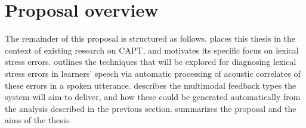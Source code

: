 %
%
%
%
%
%
%
%

\section{Proposal overview}
The remainder of this proposal is structured as follows.
 places this thesis in the context of existing research on CAPT, and motivates its specific focus on lexical stress errors.
 outlines the techniques that will be explored for diagnosing lexical stress errors in learners' speech via automatic processing of acoustic correlates of these errors in a spoken utterance.
 describes the multimodal feedback types the system will aim to deliver, and how these could be generated automatically from the analysis described in the previous section.
 summarizes the proposal and the aims of the thesis.

